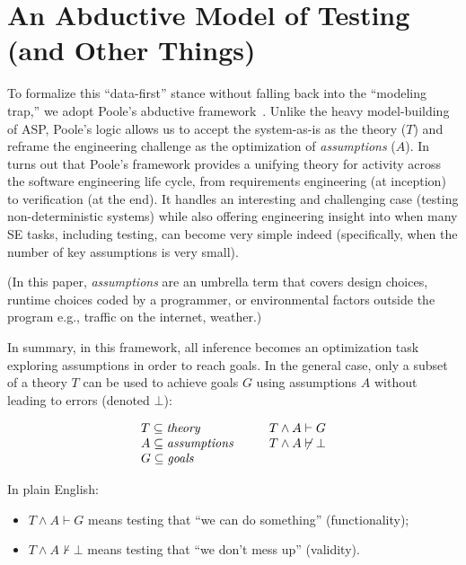 \documentclass[runningheads]{llncs}
\begin{document}
\section{An Abductive Model of Testing (and Other Things)}

To formalize this ``data-first'' stance without falling back into
the ``modeling trap,'' we adopt Poole's abductive
framework~\cite{Poole1994WhoCT}. Unlike the heavy model-building of ASP,
Poole's logic allows us to accept the system-as-is as the theory ($T$)
and reframe the engineering challenge as the optimization of
\textit{assumptions} ($A$).
In turns out that Poole's framework provides
a unifying theory for activity across the  software engineering life cycle, from
requirements engineering (at inception) to verification (at the end). It handles an interesting and challenging case (testing non-deterministic systems) while also offering engineering insight into when many SE tasks, including testing, can become very simple indeed (specifically, when the number of key assumptions is very small).



(In this paper, \textit{assumptions} are an umbrella term that covers design choices, runtime choices coded by a programmer, or environmental factors  outside the program e.g., traffic on the internet, weather.)

In summary, in this framework, all inference becomes an optimization task exploring assumptions in order to reach goals.
In the general case, only a subset of a theory $T$ can be used to
achieve goals $G$ using assumptions $A$ without leading to errors
(denoted $\bot$):

\begin{equation}\label{eq:subs}
\begin{array}{l@{\hspace{1cm}}l}
 T  \subseteq \mathit{theory}       & T \wedge A  \vdash  G        \\
 A \subseteq \mathit{assumptions}  & T \wedge A  \not\vdash \bot \\
 G \subseteq \mathit{goals}        &
\end{array}
\end{equation}

\noindent In plain English:
\begin{itemize}
    \item $ T \wedge A \vdash G$ means testing that ``we can do
    something'' (functionality);
    \item $T \wedge A \not\vdash \bot$ means testing that ``we don't
    mess up'' (validity).
\end{itemize}
 
\end{document}
